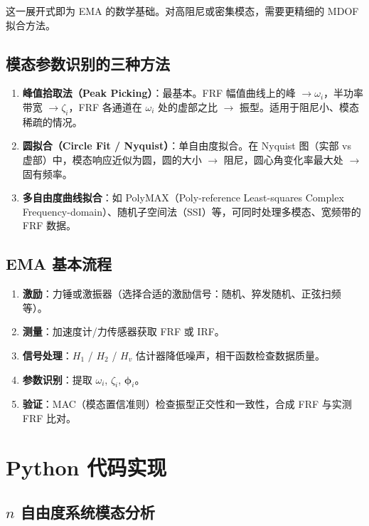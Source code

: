 这一展开式即为 EMA 的数学基础。对高阻尼或密集模态，需要更精细的 MDOF 拟合方法。

\subsection{模态参数识别的三种方法}

\begin{enumerate}
\item \textbf{峰值拾取法（Peak Picking）}：最基本。FRF 幅值曲线上的峰 $\to \omega_i$，半功率带宽 $\to \zeta_i$，FRF 各通道在 $\omega_i$ 处的虚部之比 $\to$ 振型。适用于阻尼小、模态稀疏的情况。

\item \textbf{圆拟合（Circle Fit / Nyquist）}：单自由度拟合。在 Nyquist 图（实部 vs 虚部）中，模态响应近似为圆，圆的大小 $\to$ 阻尼，圆心角变化率最大处 $\to$ 固有频率。

\item \textbf{多自由度曲线拟合}：如 PolyMAX（Poly-reference Least-squares Complex Frequency-domain）、随机子空间法（SSI）等，可同时处理多模态、宽频带的 FRF 数据。
\end{enumerate}

\subsection{EMA 基本流程}

\begin{enumerate}
\item \textbf{激励}：力锤或激振器（选择合适的激励信号：随机、猝发随机、正弦扫频等）。
\item \textbf{测量}：加速度计/力传感器获取 FRF 或 IRF。
\item \textbf{信号处理}：$H_1$ / $H_2$ / $H_v$ 估计器降低噪声，相干函数检查数据质量。
\item \textbf{参数识别}：提取 $\omega_i$, $\zeta_i$, $\bm{\phi}_i$。
\item \textbf{验证}：MAC（模态置信准则）检查振型正交性和一致性，合成 FRF 与实测 FRF 比对。
\end{enumerate}

\section{Python 代码实现}

\subsection{$n$ 自由度系统模态分析}

